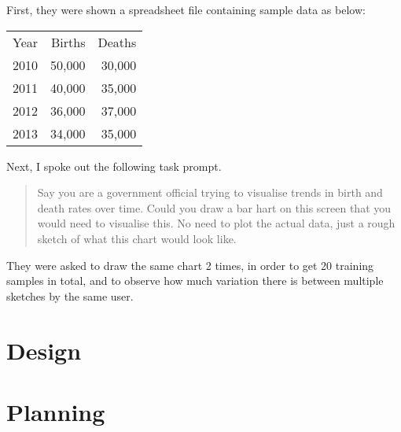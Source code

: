 	First, they were shown a spreadsheet file containing sample data as below:
	\begin{tabu}{l r r}
		\rowfont{\bfseries} Year & Births & Deaths \\
		2010 & 50,000 & 30,000 \\
		2011 & 40,000 & 35,000 \\
		2012 & 36,000 & 37,000 \\
		2013 & 34,000 & 35,000 \\
	\end{tabu}
	
	\vspace{10pt}
	
	Next, I spoke out the following task prompt.

	
	\begin{quote}
		Say you are a government official trying to visualise trends in birth and death rates over time. Could you draw a bar hart on this screen that you would need to visualise this. No need to plot the actual data, just a rough sketch of what this chart would look like.	
	\end{quote}
	
	They were asked to draw the same chart 2 times, in order to get 20 training samples in total, and to observe how much variation there is between multiple sketches by the same user. 
	\section{Design}
	\section{Planning}
